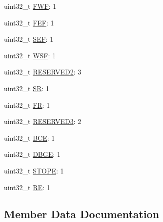 \begin{DoxyCompactItemize}
uint32\+\_\+t \hyperlink{struct__hw__i2s__rcsr_1_1__hw__i2s__rcsr__bitfields_af701287654e00361ac99b614d0cc9144}{F\+WF}\+: 1
\item 
uint32\+\_\+t \hyperlink{struct__hw__i2s__rcsr_1_1__hw__i2s__rcsr__bitfields_a403acdf0a4a46cc805ecc440fdf9faa2}{F\+EF}\+: 1
\item 
uint32\+\_\+t \hyperlink{struct__hw__i2s__rcsr_1_1__hw__i2s__rcsr__bitfields_adcd5ef6c42cf530df401cd0c536a4438}{S\+EF}\+: 1
\item 
uint32\+\_\+t \hyperlink{struct__hw__i2s__rcsr_1_1__hw__i2s__rcsr__bitfields_a2674401718cf1cca5090ca34e979ea7a}{W\+SF}\+: 1
\item 
uint32\+\_\+t \hyperlink{struct__hw__i2s__rcsr_1_1__hw__i2s__rcsr__bitfields_a5e73ca77dcd3480587e80d2d305baa8d}{R\+E\+S\+E\+R\+V\+E\+D2}\+: 3
\item 
uint32\+\_\+t \hyperlink{struct__hw__i2s__rcsr_1_1__hw__i2s__rcsr__bitfields_a6ba2e42617d854a23d37caab2673cdf6}{SR}\+: 1
\item 
uint32\+\_\+t \hyperlink{struct__hw__i2s__rcsr_1_1__hw__i2s__rcsr__bitfields_a3227faab388e0e388a67c22ac76f946b}{FR}\+: 1
\item 
uint32\+\_\+t \hyperlink{struct__hw__i2s__rcsr_1_1__hw__i2s__rcsr__bitfields_a3804b10410c292ff4b9ba503ec634b0e}{R\+E\+S\+E\+R\+V\+E\+D3}\+: 2
\item 
uint32\+\_\+t \hyperlink{struct__hw__i2s__rcsr_1_1__hw__i2s__rcsr__bitfields_a55bebe27751c5df8b9c704732c1b5d31}{B\+CE}\+: 1
\item 
uint32\+\_\+t \hyperlink{struct__hw__i2s__rcsr_1_1__hw__i2s__rcsr__bitfields_add00c77170f4de30eba452b655b54fa8}{D\+B\+GE}\+: 1
\item 
uint32\+\_\+t \hyperlink{struct__hw__i2s__rcsr_1_1__hw__i2s__rcsr__bitfields_a964dd11a6203e927f7335501f45de20c}{S\+T\+O\+PE}\+: 1
\item 
uint32\+\_\+t \hyperlink{struct__hw__i2s__rcsr_1_1__hw__i2s__rcsr__bitfields_a5ded6a971a1638669772b0589adb97ee}{RE}\+: 1
\end{DoxyCompactItemize}


\subsection{Member Data Documentation}
